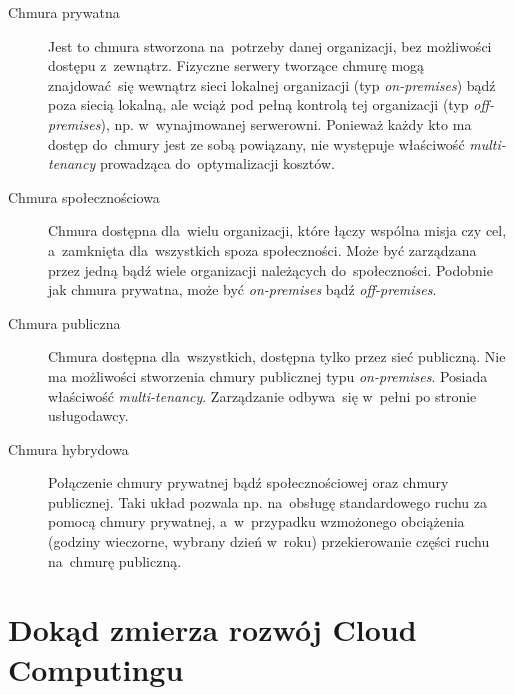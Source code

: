 \documentclass[12pt,a4paper,twoside,titlepage,openright]{book}
\begin{document}
\begin{description}
\item [Chmura prywatna] Jest to chmura stworzona na~potrzeby danej organizacji, bez możliwości dostępu z~zewnątrz. Fizyczne serwery tworzące chmurę mogą znajdować~się wewnątrz sieci lokalnej organizacji (typ \textit{on-premises}) bądź poza siecią lokalną, ale wciąż pod pełną kontrolą tej organizacji (typ \textit{off-premises}), np. w~wynajmowanej serwerowni. Ponieważ każdy kto ma dostęp do~chmury jest ze sobą powiązany, nie występuje właściwość \textit{multi-tenancy} prowadząca do~optymalizacji kosztów.
\item [Chmura społecznościowa] Chmura dostępna dla~wielu organizacji, które łączy wspólna misja czy cel, a~zamknięta dla~wszystkich spoza społeczności. Może być zarządzana przez jedną bądź wiele organizacji należących do~społeczności. Podobnie jak chmura prywatna, może być \textit{on-premises} bądź \textit{off-premises}.
\item [Chmura publiczna] Chmura dostępna dla~wszystkich, dostępna tylko przez sieć publiczną. Nie ma możliwości stworzenia chmury publicznej typu \textit{on-premises}. Posiada właściwość \textit{multi-tenancy}. Zarządzanie odbywa~się w~pełni po stronie usługodawcy.
\item [Chmura hybrydowa] Połączenie chmury prywatnej bądź społecznościowej oraz chmury publicznej. Taki układ pozwala np. na~obsługę standardowego ruchu za pomocą chmury prywatnej, a~w~przypadku wzmożonego obciążenia (godziny wieczorne, wybrany dzień w~roku) przekierowanie części ruchu na~chmurę publiczną.
\end{description}

\section{Dokąd zmierza rozwój Cloud Computingu}
\end{document}
